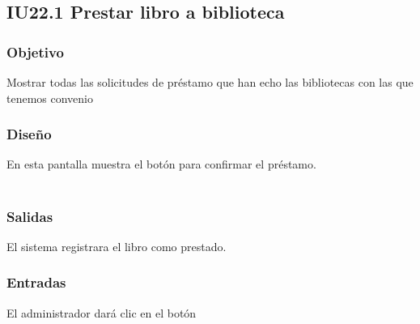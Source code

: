 \newpage
\subsection{IU22.1 Prestar libro a biblioteca}

\subsubsection{Objetivo}
	Mostrar todas las solicitudes de préstamo que han echo las bibliotecas con las que tenemos convenio  

\subsubsection{Diseño}
	En esta pantalla muestra el botón  para confirmar el préstamo.  \\\\


\subsubsection{Salidas}
	\begin{Citemize}
		\item El sistema registrara el libro como prestado. 
	\end{Citemize}
	
\subsubsection{Entradas}
	\begin{Citemize}
		\item El administrador dará clic en el botón 
	\end{Citemize}


